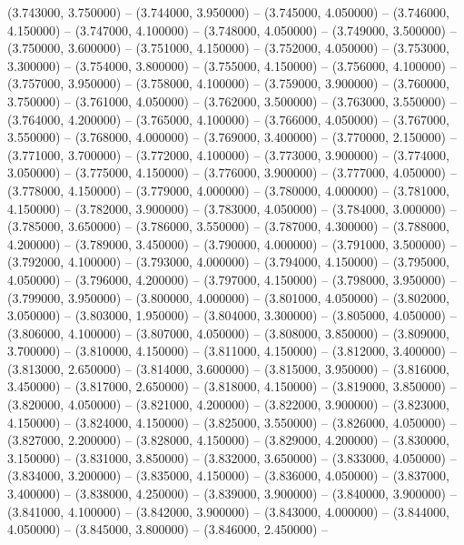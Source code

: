 (3.743000, 3.750000) -- 
(3.744000, 3.950000) -- 
(3.745000, 4.050000) -- 
(3.746000, 4.150000) -- 
(3.747000, 4.100000) -- 
(3.748000, 4.050000) -- 
(3.749000, 3.500000) -- 
(3.750000, 3.600000) -- 
(3.751000, 4.150000) -- 
(3.752000, 4.050000) -- 
(3.753000, 3.300000) -- 
(3.754000, 3.800000) -- 
(3.755000, 4.150000) -- 
(3.756000, 4.100000) -- 
(3.757000, 3.950000) -- 
(3.758000, 4.100000) -- 
(3.759000, 3.900000) -- 
(3.760000, 3.750000) -- 
(3.761000, 4.050000) -- 
(3.762000, 3.500000) -- 
(3.763000, 3.550000) -- 
(3.764000, 4.200000) -- 
(3.765000, 4.100000) -- 
(3.766000, 4.050000) -- 
(3.767000, 3.550000) -- 
(3.768000, 4.000000) -- 
(3.769000, 3.400000) -- 
(3.770000, 2.150000) -- 
(3.771000, 3.700000) -- 
(3.772000, 4.100000) -- 
(3.773000, 3.900000) -- 
(3.774000, 3.050000) -- 
(3.775000, 4.150000) -- 
(3.776000, 3.900000) -- 
(3.777000, 4.050000) -- 
(3.778000, 4.150000) -- 
(3.779000, 4.000000) -- 
(3.780000, 4.000000) -- 
(3.781000, 4.150000) -- 
(3.782000, 3.900000) -- 
(3.783000, 4.050000) -- 
(3.784000, 3.000000) -- 
(3.785000, 3.650000) -- 
(3.786000, 3.550000) -- 
(3.787000, 4.300000) -- 
(3.788000, 4.200000) -- 
(3.789000, 3.450000) -- 
(3.790000, 4.000000) -- 
(3.791000, 3.500000) -- 
(3.792000, 4.100000) -- 
(3.793000, 4.000000) -- 
(3.794000, 4.150000) -- 
(3.795000, 4.050000) -- 
(3.796000, 4.200000) -- 
(3.797000, 4.150000) -- 
(3.798000, 3.950000) -- 
(3.799000, 3.950000) -- 
(3.800000, 4.000000) -- 
(3.801000, 4.050000) -- 
(3.802000, 3.050000) -- 
(3.803000, 1.950000) -- 
(3.804000, 3.300000) -- 
(3.805000, 4.050000) -- 
(3.806000, 4.100000) -- 
(3.807000, 4.050000) -- 
(3.808000, 3.850000) -- 
(3.809000, 3.700000) -- 
(3.810000, 4.150000) -- 
(3.811000, 4.150000) -- 
(3.812000, 3.400000) -- 
(3.813000, 2.650000) -- 
(3.814000, 3.600000) -- 
(3.815000, 3.950000) -- 
(3.816000, 3.450000) -- 
(3.817000, 2.650000) -- 
(3.818000, 4.150000) -- 
(3.819000, 3.850000) -- 
(3.820000, 4.050000) -- 
(3.821000, 4.200000) -- 
(3.822000, 3.900000) -- 
(3.823000, 4.150000) -- 
(3.824000, 4.150000) -- 
(3.825000, 3.550000) -- 
(3.826000, 4.050000) -- 
(3.827000, 2.200000) -- 
(3.828000, 4.150000) -- 
(3.829000, 4.200000) -- 
(3.830000, 3.150000) -- 
(3.831000, 3.850000) -- 
(3.832000, 3.650000) -- 
(3.833000, 4.050000) -- 
(3.834000, 3.200000) -- 
(3.835000, 4.150000) -- 
(3.836000, 4.050000) -- 
(3.837000, 3.400000) -- 
(3.838000, 4.250000) -- 
(3.839000, 3.900000) -- 
(3.840000, 3.900000) -- 
(3.841000, 4.100000) -- 
(3.842000, 3.900000) -- 
(3.843000, 4.000000) -- 
(3.844000, 4.050000) -- 
(3.845000, 3.800000) -- 
(3.846000, 2.450000) -- 
